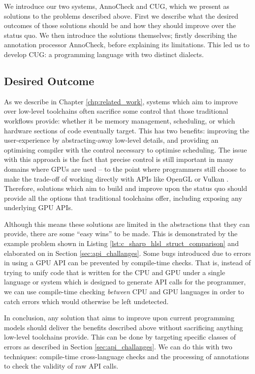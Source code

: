 \documentclass[a4paper,12pt,twoside,openright]{report}
\begin{document}
\label{sec:solutions_introduction}

We introduce our two systems, AnnoCheck and CUG, which we present as solutions
to the problems described above. First we describe what the desired outcomes of
those solutions should be and how they should improve over the status quo. We
then introduce the solutions themselves; firstly describing the annotation
processor AnnoCheck, before explaining its limitations. This led us to develop
CUG: a programming language with two distinct dialects.

\subsection{Desired Outcome}

As we describe in Chapter \ref{chp:related_work}, systems which aim to improve
over low-level toolchains often sacrifice some control that those traditional
workflows provide: whether it be memory management, scheduling, or which
hardware sections of code eventually target. This has two benefits: improving
the user-experience by abstracting-away low-level details, and providing an
optimising compiler with the control necessary to optimise scheduling. The
issue with this approach is the fact that precise control is still important in
many domains where GPUs are used -- to the point where programmers still choose
to make the trade-off of working directly with APIs like OpenGL or Vulkan
\cite{ListOfOpenGLGames} \cite{ListOfVulkanGames}. Therefore, solutions which
aim to build and improve upon the status quo should provide all the options
that traditional toolchains offer, including exposing any underlying GPU APIs.

Although this means these solutions are limited in the abstractions that they
can provide, there are some ``easy wins'' to be made. This is demonstrated by
the example problem shown in Listing \ref{lst:c_sharp_hlsl_struct_comparison}
and elaborated on in Section \ref{sec:api_challanges}. Some bugs introduced due
to errors in using a GPU API can be prevented by compile-time checks. That is,
instead of trying to unify code that is written for the CPU and GPU under a
single language or system which is designed to generate API calls for the
programmer, we can use compile-time checking \textit{between} CPU and GPU
languages in order to catch errors which would otherwise be left undetected.

In conclusion, any solution that aims to improve upon current programming
models should deliver the benefits described above without sacrificing anything
low-level toolchains provide. This can be done by targeting specific classes of
errors as described in Section \ref{sec:api_challanges}. We can do this with
two techniques: compile-time cross-language checks and the processing of
annotations to check the validity of raw API calls.
\end{document}

